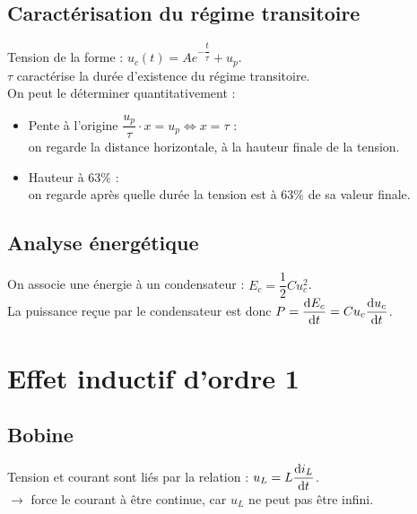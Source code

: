 \documentclass[13pt, twoside, a4paper, french]{report}
\begin{document}
    \subsection{Caractérisation du régime transitoire}\label{subsec:caracterisation-du-regime-transitoire}

    Tension de la forme : $u_c(t) = A e^{-\dfrac{t}{\tau}} + u_p$.\\

    $\tau$ caractérise la durée d'existence du régime transitoire.\\
    On peut le déterminer quantitativement :
    \begin{itemize}
        \item Pente à l'origine $\dfrac{u_p}{\tau} \cdot x = u_p \iff x = \tau$ :\\
        on regarde la distance horizontale, à la hauteur finale de la tension.
        \item Hauteur à $63\%$ :\\
        on regarde après quelle durée la tension est à $63\%$ de sa valeur finale.
    \end{itemize}

    \subsection{Analyse énergétique}\label{subsec:analyse-energetique}

    On associe une énergie à un condensateur : $E_c = \dfrac{1}{2} C u_c^2$.\\
    La puissance reçue par le condensateur est donc $P = \dfrac{\textrm d E_c}{\textrm d t} = C u_c \dfrac{\textrm d u_c}{\textrm d t}$.\\


    \section{Effet inductif d'ordre 1}\label{sec:effet-inductif-d'ordre-1}

    \subsection{Bobine}\label{subsec:bobine}

    Tension et courant sont liés par la relation : $u_L = L \dfrac{\textrm d i_L}{\textrm d t}$.\\
    $\rightarrow$ force le courant à être continue, car $u_L$ ne peut pas être infini.\\
\end{document}
